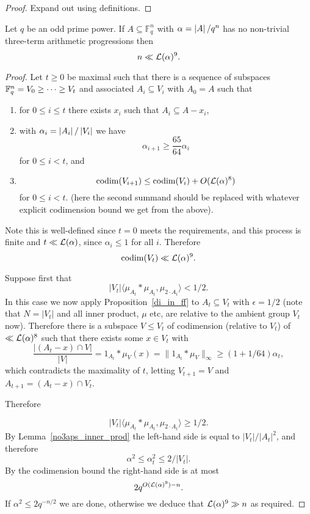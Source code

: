 \begin{proof}
\leanok
Expand out using definitions.
\end{proof}


\begin{theorem}
Let $q$ be an odd prime power. If $A\subseteq \mathbb{F}_q^n$ with $\alpha=\left\lvert A\right\rvert/q^n$ has no non-trivial three-term arithmetic progressions then
\[n \ll \mathcal{L}{(}\alpha)^9.\]
\end{theorem}
\begin{proof}
Let $t\geq 0$ be maximal such that there is a sequence of subspaces $\mathbb{F}_q^n=V_0\geq \cdots \geq V_t$ and associated $A_i\subseteq V_i$ with $A_0=A$ such that
\begin{enumerate}
\item for $0\leq i\leq t$ there exists $x_i$ such that $A_i\subseteq A-x_i$,
\item with $\alpha_i=\left\lvert A_i\right\rvert/\left\lvert V_i\right\rvert$ we have
\[\alpha_{i+1}\geq \frac{65}{64}\alpha_i\]
for $0\leq i<t$, and
\item \[\mathrm{codim} (V_{i+1}) \leq \mathrm{codim}(V_i)+O(\mathcal{L}{(}\alpha)^8)\]
for $0\leq i<t$. (here the second summand should be replaced with whatever explicit codimension bound we get from the above).
\end{enumerate}

Note this is well-defined since $t=0$ meets the requirements, and this process is finite and $t \ll \mathcal{L}{(}\alpha)$, since $\alpha_i\leq 1$ for all $i$. Therefore
\[\mathrm{codim}(V_t) \ll \mathcal{L}{(}\alpha)^9.\]

Suppose first that
\[\lvert V_t\rvert\langle \mu_{A_t}\ast \mu_{A_t},\mu_{2\cdot A_t}\rangle<1/2.\]
In this case we now apply Proposition~\ref{di_in_ff} to $A_t\subseteq V_t$ with $\epsilon=1/2$ (note that $N=\lvert V_t\rvert$ and all inner product, $\mu$ etc, are relative to the ambient group $V_t$ now). Therefore there is a subspace $V\leq V_t$ of codimension (relative to $V_t$) of $\ll \mathcal{L}{(}\alpha)^8$ such that there exists some $x\in V_t$ with
\[\frac{\lvert (A_t-x)\cap V\rvert}{\lvert V\rvert}=1_{A_t}\ast \mu_V(x)=\| 1_{A_t}\ast \mu_V\|_\infty \geq (1+1/64)\alpha_t,\]
which contradicts the maximality of $t$, letting $V_{t+1}=V$ and $A_{t+1}=(A_t-x)\cap V_t$.

Therefore

\[\lvert V_t\rvert\langle \mu_{A_t}\ast \mu_{A_t},\mu_{2\cdot A_t}\rangle\geq 1/2.\]
By Lemma~\ref{no3aps_inner_prod} the left-hand side is equal to $\lvert V_t\rvert/\lvert A_t\rvert^2$, and therefore
\[\alpha^2 \leq \alpha_t^2 \leq 2/\lvert V_t\rvert.\]
By the codimension bound the right-hand side is at most
\[2q^{O(\mathcal{L}{(}\alpha)^9)-n}.\]
If $\alpha^2 \leq 2q^{-n/2}$ we are done, otherwise we deduce that $\mathcal{L}{(}\alpha)^9 \gg n$ as required.
\end{proof}


